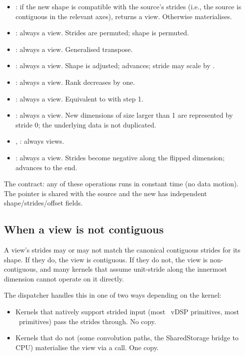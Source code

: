 \begin{itemize}
  \item {}: if the new shape is compatible with
    the source's strides (i.e., the source is contiguous in the
    relevant axes), returns a view. Otherwise materialises.
  \item {}: always a view. Strides are
    permuted; shape is permuted.
  \item {}: always a view. Generalised transpose.
  \item {}: always a view. Shape
    is adjusted;  advances; stride may scale
    by .
  \item {}: always a view. Rank decreases
    by one.
  \item {}: always a view.
    Equivalent to  with step 1.
  \item {}: always a view. New dimensions of
    size larger than 1 are represented by stride 0; the underlying
    data is not duplicated.
  \item {}, : always views.
  \item {}: always a view. Strides become negative
    along the flipped dimension;  advances
    to the end.
\end{itemize}

The contract: any of these operations runs in constant time (no
data motion). The  pointer is shared with the source
and the new  has independent shape/strides/offset
fields.

\subsection{When a view is not contiguous}
\label{ssec:tensor_model:noncontig}

A view's strides may or may not match the canonical contiguous
strides for its shape. If they do, the view is contiguous. If they
do not, the view is non-contiguous, and many kernels that assume
unit-stride along the innermost dimension cannot operate on it
directly.

The dispatcher handles this in one of two ways depending on the
kernel:

\begin{itemize}
  \item Kernels that natively support strided input (most
    \Accelerate\ vDSP primitives, most \MLX\ primitives) pass the
    strides through. No copy.
  \item Kernels that do not (some convolution paths, the
    SharedStorage bridge to CPU) materialise the view via a
     call. One copy.
\end{itemize}

